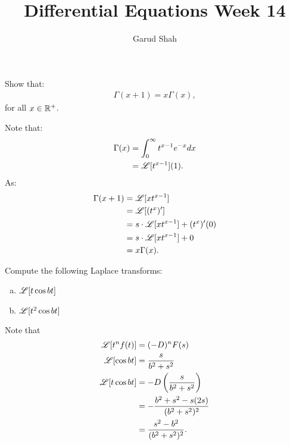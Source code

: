 \documentclass[11pt]{article}
\title{Differential Equations Week \textbf{14}}
\author{Garud Shah}
\begin{document}
    \maketitle \newpage 
    \begin{problem}
        Show that:
        \begin{align}
            \Gamma(x+1) = x\Gamma(x),
        \end{align}
        for all $x \in \mathbb R^+$.
    \end{problem}
    \begin{solution}
        Note that:
        \begin{align}
            \Gamma (x) &= \int _{0}^{\infty }t^{x-1}e^{-x}dx \\
            &= \mathscr L[t^{x-1}](1).
        \end{align}
        As:
        \begin{align}
            \Gamma(x+1) &= \mathscr L[xt^{x-1}] \\ 
            &= \mathscr L[(t^{x})'] \\
            &= s \cdot \mathscr L[xt^{x-1}] + (t^x)'(0) \\
            &= s \cdot \mathscr L[xt^{x-1}] + 0 \\
            &= x\Gamma(x).
        \end{align}
    \end{solution}
    \newpage
    \begin{problem}
        Compute the following Laplace transforms:
        \begin{enumerate}[(a)]
            \item $\mathscr L [t \cos bt]$
            \item $\mathscr L [t^2 \cos bt]$
        \end{enumerate}
    \end{problem}
    \begin{solution} Note that 
        \begin{align}
            \mathscr L [t^n f(t)] &= (-D)^nF(s) \\
            \mathscr L [\cos bt] &= \dfrac{s}{b^2+s^2} \\
            \mathscr L [t \cos bt] &= -D \left(\dfrac{s}{b^2+s^2}\right) \\
            &= -\dfrac{b^2+s^2-s(2s)}{(b^2 + s^2)^2} \\
            &= \dfrac{s^2-b^2}{(b^2+s^2)^2}.
        \end{align}
    \end{solution}
\end{document}
